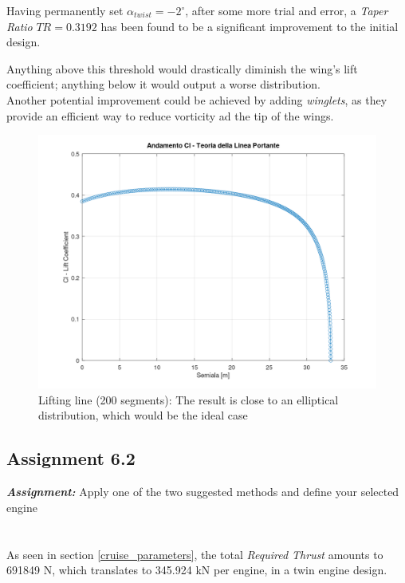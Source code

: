 \documentclass{article}
\begin{document}
Having permanently set $\alpha_{twist} = -2^{\circ}$, after some more trial and error, a \textit{Taper Ratio} 
$TR = 0.3192$ has been found to be a significant improvement to the initial design.

Anything above this threshold would drastically diminish the wing's lift coefficient; anything below
it would output a worse distribution. \\ 

Another potential improvement could be achieved by adding \textit{winglets}, as they provide an efficient
way to reduce vorticity ad the tip of the wings.

\begin{figure}[h!]
    \centering
    \includegraphics[width=\textwidth]{Sources/Plots_and_Pictures/Linea_Portante.png}
    \caption{Lifting line (200 segments): The result is close to an elliptical distribution, which would be the ideal case}
    \label{lifting_line}
\end{figure}


\clearpage
\subsection{Assignment 6.2\label{Assignment_6.2}}

\textbf{\textit{Assignment:}} Apply one of the two suggested methods and define your selected engine \\ \\ \\ 

As seen in section \ref{cruise_parameters}, the total \textit{Required Thrust} amounts to 691849 N, which
translates to 345.924 kN per engine, in a twin engine design.\\ 
\end{document}
